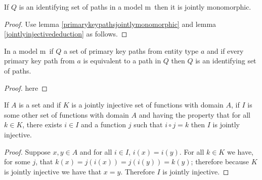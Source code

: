 \documentclass[10pt,a4paper]{article}
\newcommand{\genericmodel}{\mathcal{M}}
\renewcommand{\genericmodel}{{m}}
\begin{document}
\begin{lemma}
If $Q$ is an identifying set of paths in a model \genericmodel\ then it is jointly monomorphic.
\end{lemma}
\begin{proof}
Use lemma \ref{primarykeypathsjointlymonomorphic} and lemma \ref{jointlyinjectivededuction} as follows. 
\end{proof}

\begin{lemma} 
\label{primarypathrepresentativesidentifying}
In a model \genericmodel\ if $Q$ a set of primary key paths from entity type $a$ 
and if every primary key path from $a$ is equivalent to a path in $Q$ then
$Q$ is an identifying set of paths. 
\end{lemma}
\begin{proof}
here
\end{proof}

\begin{lemma}
\label{jointlyinjectivededuction}
If $A$ is a set and if  $K$ is a jointly injective set of functions with domain $A$, if $I$ is
some other set of functions with domain $A$ and having the property that for all $k \in K$,
there exists $i \in  I$ and a function $j$ such that $i \circ j = k$ then $I$ is jointly injective.
\end{lemma}
\begin{proof}
Suppose $x,y \in A$ and for all $i \in I$, $i(x)=i(y)$. For all $k \in K$ we have, for some $j$, that
$k(x) = j(i(x)) = j(i(y)) = k(y)$; therefore because $K$ is jointly injective we have that $x=y$.
Therefore $I$ is jointly injective. 
\end{proof}
\end{document}
